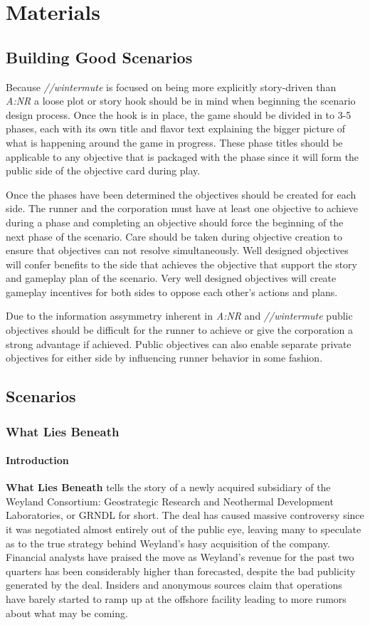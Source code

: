 \documentclass[titlepage]{article}
\begin{document}
\section{Materials}
\subsection{Building Good Scenarios}
Because \emph{//wintermute} is focused on being more explicitly story-driven than \emph{A:NR} a loose plot or story hook should be in mind when beginning the scenario design process. Once the hook is in place, the game should be divided in to 3-5 phases, each with its own title and flavor text explaining the bigger picture of what is happening around the game in progress. These phase titles should be applicable to any objective that is packaged with the phase since it will form the public side of the objective card during play.  

Once the phases have been determined the objectives should be created for each side. The runner and the corporation must have at least one objective to achieve during a phase and completing an objective should force the beginning of the next phase of the scenario. Care should be taken during objective creation to ensure that objectives can not resolve simultaneously. Well designed objectives will confer benefits to the side that achieves the objective that support the story and gameplay plan of the scenario. Very well designed objectives will create gameplay incentives for both sides to oppose each other's actions and plans. 

Due to the information assymmetry inherent in \emph{A:NR} and \emph{//wintermute} public objectives should be difficult for the runner to achieve or give the corporation a strong advantage if achieved. Public objectives can also enable separate private objectives for either side by influencing runner behavior in some fashion.  
\subsection{Scenarios}
\subsubsection{What Lies Beneath}
\paragraph{Introduction}

\textbf{What Lies Beneath} tells the story of a newly acquired subsidiary of the Weyland Consortium: Geostrategic Research and Neothermal Development Laboratories, or GRNDL for short. The deal has caused massive controversy since it was negotiated almost entirely out of the public eye, leaving many to speculate as to the true strategy behind Weyland's hasy acquisition of the company. Financial analysts have praised the move as Weyland's revenue for the past two quarters has been considerably higher than forecasted, despite the bad publicity generated by the deal. Insiders and anonymous sources claim that operations have barely started to ramp up at the offshore facility leading to more rumors about what may be coming.  
\end{document}
